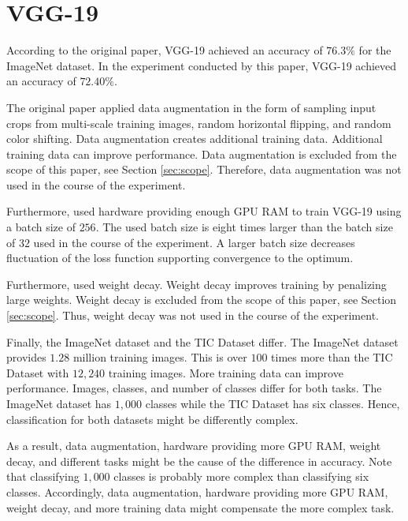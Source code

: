 \section{VGG-19}
According to the original paper, VGG-19 achieved an accuracy of $76.3 \%$ for the ImageNet dataset. \autocite{Simonyan.2014} In the experiment conducted by this paper, VGG-19 achieved an accuracy of $72.40 \%$. 
\par
The original paper applied data augmentation in the form of sampling input crops from multi-scale training images, random horizontal flipping, and random color shifting. \autocite{Simonyan.2014} Data augmentation creates additional training data. Additional training data can improve performance. \autocite{ElAmir.2020} Data augmentation is excluded from the scope of this paper, see Section \ref{sec:scope}. Therefore, data augmentation was not used in the course of the experiment. 
\par
Furthermore, \cite{Simonyan.2014} used hardware providing enough GPU RAM to train VGG-19 using a batch size of $256$. The used batch size is eight times larger than the batch size of $32$ used in the course of the experiment. A larger batch size decreases fluctuation of the loss function supporting convergence to the optimum. \autocite{Ruder.2016}
\par
Furthermore, \cite{Simonyan.2014} used weight decay. Weight decay improves training by penalizing large weights. \autocite{ElAmir.2020} Weight decay is excluded from the scope of this paper, see Section \ref{sec:scope}. Thus, weight decay was not used in the course of the experiment. 
\par
Finally, the ImageNet dataset and the \ac{TIC Dataset} differ. The ImageNet dataset provides $1.28$ million training images. This is over $100$ times more than the \ac{TIC Dataset} with $12{,}240$ training images. \autocite{He.2016} More training data can improve performance. \autocite{ElAmir.2020} Images, classes, and number of classes differ for both tasks. The ImageNet dataset has $1{,}000$ classes while the \ac{TIC Dataset} has six classes. Hence, classification for both datasets might be differently complex.
\par
As a result, data augmentation, hardware providing more GPU RAM, weight decay, and different tasks might be the cause of the difference in accuracy. Note that classifying $1{,}000$ classes is probably more complex than classifying six classes. Accordingly, data augmentation, hardware providing more GPU RAM, weight decay, and more training data might compensate the more complex task.

